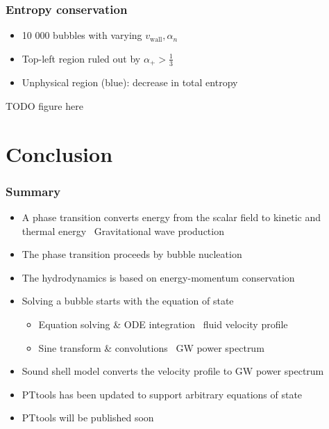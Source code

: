 \begin{frame}
    \frametitle{Entropy conservation}
    \begin{minipage}[t]{0.48\linewidth}
        \begin{itemize}
            \item 10 000 bubbles with varying $v_\text{wall}, \alpha_n$
            \item Top-left region ruled out by $\alpha_+ > \frac{1}{3}$
            \item Unphysical region (blue): decrease in total entropy
        \end{itemize}%
    \end{minipage}%
    \hfill%
    \begin{minipage}[t]{0.48\linewidth}%
        TODO figure here
    \end{minipage}
\end{frame}
\fi

\section{Conclusion}

\begin{frame}
    \frametitle{Summary}
    \begin{itemize}
        \item A phase transition converts energy from the scalar field to kinetic and thermal energy
            \textrightarrow \ Gravitational wave production
        \item The phase transition proceeds by bubble nucleation
        \item The hydrodynamics is based on energy-momentum conservation
        \item Solving a bubble starts with the equation of state
        \begin{itemize}
            \item Equation solving \& ODE integration \textrightarrow \ fluid velocity profile
            \item Sine transform \& convolutions \textrightarrow \ GW power spectrum
        \end{itemize}
        \item Sound shell model converts the velocity profile to GW power spectrum
        \item PTtools has been updated to support arbitrary equations of state
        \item PTtools will be published soon
    \end{itemize}
\end{frame}

